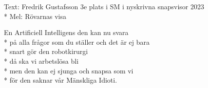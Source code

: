 \begin{SongText}
    \begin{SongInfo}
        Text: Fredrik Gustafsson 3e plats i SM i nyskrivna snapsvisor 2023\\*%
        Mel: Rövarnas visa
    \end{SongInfo}
    \begin{SongVerse}
        En Artificiell Intelligens den kan nu svara\\*%
        på alla frågor som du ställer och det är ej bara\\*%
        snart gör den robotkirurgi\\*%
        då ska vi arbetslösa bli\\*%
        men den kan ej sjunga och snapsa som vi\\*%
        för den saknar vår Mänskliga Idioti.
    \end{SongVerse}
\end{SongText}
